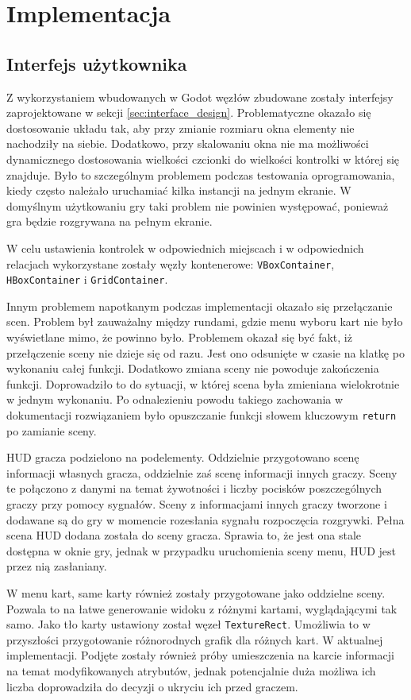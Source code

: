 \chapter{Implementacja}\label{ch:development}
\section{Interfejs użytkownika}
Z wykorzystaniem wbudowanych w Godot węzłów zbudowane zostały interfejsy zaprojektowane w sekcji \ref{sec:interface_design}. Problematyczne okazało się dostosowanie układu tak, aby przy zmianie rozmiaru okna elementy nie nachodziły na siebie. Dodatkowo, przy skalowaniu okna nie ma możliwości dynamicznego dostosowania wielkości czcionki do wielkości kontrolki w której się znajduje.  Było to szczególnym problemem podczas testowania oprogramowania, kiedy często należało uruchamiać kilka instancji na jednym ekranie. W domyślnym użytkowaniu gry taki problem nie powinien występować, ponieważ gra będzie rozgrywana na pełnym ekranie.

W celu ustawienia kontrolek w odpowiednich miejscach i w odpowiednich relacjach wykorzystane zostały węzły kontenerowe: \texttt{VBoxContainer}, \texttt{HBoxContainer} i \texttt{GridContainer}.

Innym problemem napotkanym podczas implementacji okazało się przełączanie scen. Problem był zauważalny między rundami, gdzie menu wyboru kart nie było wyświetlane mimo, że powinno było. Problemem okazał się być fakt, iż przełączenie sceny nie dzieje się od razu. Jest ono odsunięte w czasie na klatkę po wykonaniu całej funkcji. Dodatkowo zmiana sceny nie powoduje zakończenia funkcji. Doprowadziło to do sytuacji, w której scena była zmieniana wielokrotnie w jednym wykonaniu. Po odnalezieniu powodu takiego zachowania w dokumentacji rozwiązaniem było opuszczanie funkcji słowem kluczowym \texttt{return} po zamianie sceny.

HUD gracza podzielono na podelementy. Oddzielnie przygotowano scenę informacji własnych gracza, oddzielnie zaś scenę informacji innych graczy. Sceny te połączono z danymi na temat żywotności i liczby pocisków poszczególnych graczy przy pomocy sygnałów. Sceny z informacjami innych graczy tworzone i dodawane są do gry w momencie rozesłania sygnału rozpoczęcia rozgrywki. Pełna scena HUD dodana została do sceny gracza. Sprawia to, że jest ona stale dostępna w oknie gry, jednak w przypadku uruchomienia sceny menu, HUD jest przez nią zasłaniany.

W menu kart, same karty również zostały przygotowane jako oddzielne sceny. Pozwala to na łatwe generowanie widoku z różnymi kartami, wyglądającymi tak samo. Jako tło karty ustawiony został węzeł \texttt{TextureRect}. Umożliwia to w przyszłości przygotowanie różnorodnych grafik dla różnych kart. W aktualnej implementacji. Podjęte zostały również próby umieszczenia na karcie informacji na temat modyfikowanych atrybutów, jednak potencjalnie duża możliwa ich liczba doprowadziła do decyzji o ukryciu ich przed graczem.

